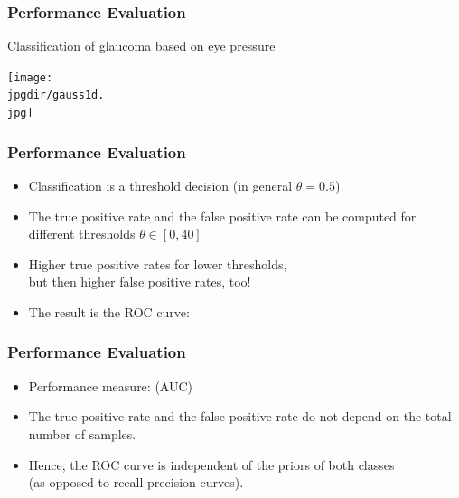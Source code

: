 \begin{frame}
   \frametitle{Performance Evaluation \cont}

    Classification of glaucoma based on eye pressure

   \begin{center}
      \texttt{[image: \\jpgdir/gauss1d.\\jpg]}
   \end{center}
\end{frame}


\begin{frame}
   \frametitle{Performance Evaluation \cont}

   \begin{itemize}
      \item Classification is a threshold decision (in general $\theta = 0.5$)
      \item The true positive rate and the false positive rate can be computed for different thresholds $\theta \in [0,40]$
      \item Higher true positive rates for lower thresholds, \\
        but then higher false positive rates, too!
      \item The result is the ROC curve:
   \end{itemize}

   \begin{center}
      \resizebox{.35\linewidth}{!}{
         
      }
   \end{center}
\end{frame}


\begin{frame}
   \frametitle{Performance Evaluation \cont}

   \begin{itemize}
      \item Performance measure:  (AUC) \\[.3cm]
      \item The true positive rate and the false positive rate do not depend on the total number of samples.
      \item Hence, the ROC curve is independent of the priors of both classes \\
        (as opposed to recall-precision-curves).
   \end{itemize}
\end{frame}


